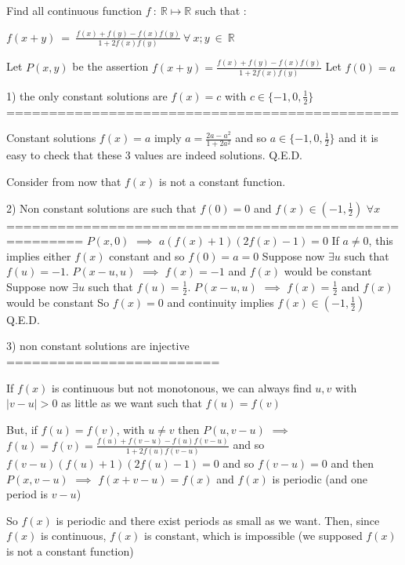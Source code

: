 \begin{solution}
	\begin{tcolorbox}\begin{italicized}Find all continuous  function $ f \ : \ \mathbb{R} \mapsto \mathbb{R}$ such that :

        $ f(x + y) \ = \ \frac { f(x) + f(y) - f(x)f(y) }{1 + 2f(x)f(y) } \ \forall \ x; y \ \in \ \mathbb{R}$\end{italicized}\end{tcolorbox}

Let $ P(x,y)$ be the assertion $ f(x+y)=\frac{f(x)+f(y)-f(x)f(y)}{1+2f(x)f(y)}$
Let $ f(0)=a$

1) the only constant solutions are $ f(x)=c$ with $ c\in\{-1,0,\frac 12\}$
==============================================

Constant solutions $ f(x)=a$ imply $ a=\frac{2a-a^2}{1+2a^2}$ and so $ a\in\{-1, 0,\frac 12\}$ and it is easy to check that these 3 values are indeed solutions.
Q.E.D.

Consider from now that $ f(x)$ is not a constant function.

2) Non constant solutions are such that $ f(0)=0$ and $ f(x)\in(-1,\frac 12)$ $ \forall x$
=======================================================
$ P(x,0)$ $ \implies$ $ a(f(x)+1)(2f(x)-1)=0$
If $ a\ne 0$, this implies either $ f(x)$ constant and so $ f(0)=a=0$
Suppose now $ \exists u$ such that $ f(u)=-1$. $ P(x-u,u)$ $ \implies$ $ f(x)=-1$ and $ f(x)$ would be constant
Suppose now $ \exists u$ such that $ f(u)=\frac 12$. $ P(x-u,u)$ $ \implies$ $ f(x)=\frac 12$ and $ f(x)$ would be constant
So $ f(x)=0$ and continuity implies $ f(x)\in(-1,\frac 12)$
Q.E.D.

3) non constant solutions are injective
=========================

If $ f(x)$ is continuous but not monotonous, we can always find $ u,v$ with $ |v-u|>0$ as little as we want such that $ f(u)=f(v)$

But, if $ f(u)=f(v)$, with $ u\ne v$ then $ P(u,v-u)$ $ \implies$ $ f(u)=f(v)=\frac{f(u)+f(v-u)-f(u)f(v-u)}{1+2f(u)f(v-u)}$ and so $ f(v-u)(f(u)+1)(2f(u)-1)=0$ and so $ f(v-u)=0$ and then $ P(x,v-u)$ $ \implies$ $ f(x+v-u)=f(x)$ and $ f(x)$ is periodic (and one period is $ v-u$)

So $ f(x)$ is periodic and there exist periods as small as we want. Then, since $ f(x)$ is continuous, $ f(x)$ is constant, which is impossible (we supposed $ f(x)$ is not a constant function)


\end{solution}
